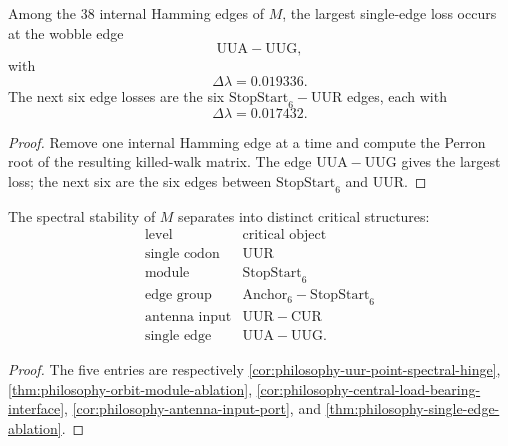 \begin{theorem}
\label{thm:philosophy-single-edge-ablation}
Among the $38$ internal Hamming edges of $M$, the largest single-edge
loss occurs at the wobble edge
$$
  \mathrm{UUA}-\mathrm{UUG},
$$
with
$$
  \Delta\lambda=0.019336.
$$
The next six edge losses are the six
$\mathrm{StopStart}_{6}-\mathrm{UUR}$ edges, each with
$$
  \Delta\lambda=0.017432.
$$
\end{theorem}
\begin{proof}
Remove one internal Hamming edge at a time and compute the Perron root
of the resulting killed-walk matrix. The edge
$\mathrm{UUA}-\mathrm{UUG}$ gives the largest loss; the next six are
the six edges between $\mathrm{StopStart}_{6}$ and $\mathrm{UUR}$.
\end{proof}

\begin{theorem}
\label{thm:philosophy-spectral-hinges-load-bearing-interfaces}
The spectral stability of $M$ separates into distinct critical
structures:
$$
\begin{array}{c|c}
  \text{level} & \text{critical object}\\
  \hline
  \text{single codon} & \mathrm{UUR}\\
  \text{module} & \mathrm{StopStart}_{6}\\
  \text{edge group} & \mathrm{Anchor}_{6}-\mathrm{StopStart}_{6}\\
  \text{antenna input} & \mathrm{UUR}-\mathrm{CUR}\\
  \text{single edge} & \mathrm{UUA}-\mathrm{UUG}.
\end{array}
$$
\end{theorem}
\begin{proof}
The five entries are respectively
\autoref{cor:philosophy-uur-point-spectral-hinge},
\autoref{thm:philosophy-orbit-module-ablation},
\autoref{cor:philosophy-central-load-bearing-interface},
\autoref{cor:philosophy-antenna-input-port}, and
\autoref{thm:philosophy-single-edge-ablation}.
\end{proof}



